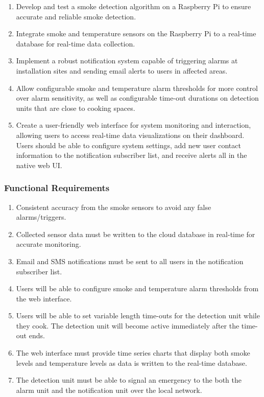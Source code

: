 \begin{enumerate}
    \item Develop and test a smoke detection algorithm on a Raspberry Pi to ensure accurate and reliable smoke detection.

    \item Integrate smoke and temperature sensors on the Raspberry Pi to a real-time database for real-time data collection.

    \item Implement a robust notification system capable of triggering alarms at installation sites and sending email alerts to
          users in affected areas.

    \item Allow configurable smoke and temperature alarm thresholds for more control over alarm sensitivity, as well as
          configurable time-out durations on detection units that are close to cooking spaces.

    \item Create a user-friendly web interface for system monitoring and interaction, allowing users to access real-time data
          visualizations on their dashboard. Users should be able to configure system settings, add new user contact information
          to the notification subscriber list, and receive alerts all in the native web UI.

\end{enumerate}

\subsubsection{Functional Requirements}

\begin{enumerate}
    \item Consistent accuracy from the smoke sensors to avoid any false alarms/triggers.

    \item Collected sensor data must be written to the cloud database in real-time for accurate monitoring.

    \item Email and SMS notifications must be sent to all users in the notification subscriber list.

    \item Users will be able to configure smoke and temperature alarm thresholds from the web interface.

    \item Users will be able to set variable length time-outs for the detection unit while they cook. The detection unit will
          become active immediately after the time-out ends.

    \item The web interface must provide time series charts that display both smoke levels and temperature levels as data is
          written to the real-time database.

    \item The detection unit must be able to signal an emergency to the both the alarm unit and the notification unit over the
          local network.
\end{enumerate}

